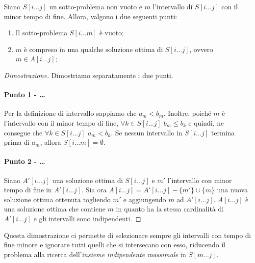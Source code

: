 \begin{definition}
    Siano $S[i\dots j]$ un sotto-problema non vuoto e $m$ l'intervallo di $S[i\dots
    j]$ con il minor tempo di fine. Allora, valgono i due seguenti punti:
    \begin{enumerate}
        \item Il sotto-problema $S[i\dots m]$ è vuoto;
        \item $m$ è compreso in una qualche soluzione ottima di $S[i\dots j]$,
        ovvero $m\in A[i\dots j]$;
    \end{enumerate}
\end{definition}
\begin{proof}[Dimostrazione]
    Dimostriamo separatamente i due punti.

    \paragraph{Punto 1 - \bm{$S[i$}\dots\bm{$ j]=\emptyset$}}
    Per la definizione di intervallo sappiamo che $a_m<b_m$. Inoltre, poiché $m$
    è l'intervallo con il minor tempo di fine, $\forall k\in S[i\dots j]$ $b_m
    \leq b_k$ e quindi, ne consegue che $\forall k\in S[i\dots j]$ $a_m<b_k$.
    Se nessun intervallo in $S[i\dots j]$ termina prima di $a_m$, allora $S[i
    \dots m]=\emptyset$.

    \paragraph*{Punto 2 - \bm{$m\in A[i$}\dots\bm{$i]$}}
    Siano $A'[i\dots j]$ una soluzione ottima di $S[i\dots j]$ e $m'$ l'intervallo
    con minor tempo di fine in $A'[i\dots j]$. Sia ora $A[i\dots j]=A'[i\dots j]
    -\{m'\}\cup\{m\}$ una nuova soluzione ottima ottenuta togliendo $m'$ e
    aggiungendo $m$ ad $A'[i\dots j]$. $A[i\dots j]$ è una soluzione ottima che
    contiene $m$ in quanto ha la stessa cardinalità di $A'[i\dots j]$ e gli
    intervalli sono indipendenti.
\end{proof}

\noindent
Questa dimostrazione ci permette di selezionare sempre gli intervalli con tempo
di fine minore e ignorare tutti quelli che si intersecano con esso, riducendo
il problema alla ricerca dell'\emph{insieme indipendente massimale} in $S[m\dots
j]$.

